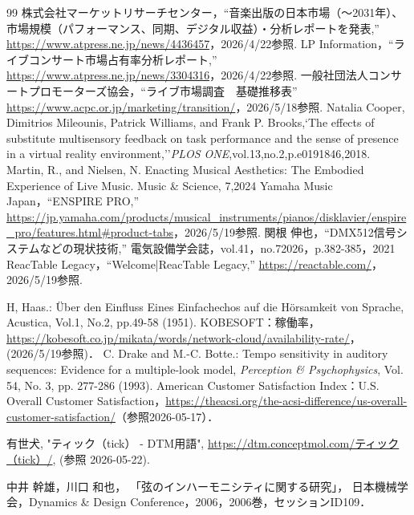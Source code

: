 \documentclass[lualatex,book,paper=a4paper,jafontsize=11.5pt,jafontscale=1.05]{jlreq}
\begin{document}
\clearpage
\begin{thebibliography}{99}
     株式会社マーケットリサーチセンター，``音楽出版の日本市場（～2031年）、市場規模（パフォーマンス、同期、デジタル収益）・分析レポートを発表,'' \url{https://www.atpress.ne.jp/news/4436457}，2026/4/22参照.
     LP Information，``ライブコンサート市場占有率分析レポート,'' \url{https://www.atpress.ne.jp/news/3304316}，2026/4/22参照.
     一般社団法人コンサートプロモーターズ協会，``ライブ市場調査　基礎推移表'' \url{https://www.acpc.or.jp/marketing/transition/}，2026/5/18参照.
     Natalia Cooper, Dimitrios Mileounis, Patrick Williams, and Frank P. Brooks,`The effects of substitute multisensory feedback on task performance and the sense of presence in a virtual reality environment,''\textit{PLOS ONE},vol.13,no.2,p.e0191846,2018.
      Martin, R., and Nielsen, N. Enacting Musical Aesthetics: The Embodied Experience of Live Music. Music \& Science, 7,2024
     Yamaha Music Japan，``ENSPIRE PRO,'' \url{https://jp.yamaha.com/products/musical_instruments/pianos/disklavier/enspire_pro/features.html#product-tabs}，2026/5/19参照.
     関根 伸也，``DMX512信号システムなどの現状技術,'' 電気設備学会誌，vol.41，no.72026，p.382-385，2021
     ReacTable Legacy，``Welcome|ReacTable Legacy,'' \url{https://reactable.com/}，2026/5/19参照.


     H, Haas.: Über den Einfluss Eines Einfachechos auf die Hörsamkeit von Sprache, Acustica, Vol.1, No.2, pp.49-58 (1951). 
    KOBESOFT：稼働率，
        \url{https://kobesoft.co.jp/mikata/words/network-cloud/availability-rate/}，
            (2026/5/19参照)．
    C. Drake and M.-C. Botte.:
    Tempo sensitivity in auditory sequences: Evidence for a multiple-look model,
    \textit{Perception \& Psychophysics},
            Vol. 54, No. 3, pp. 277-286 (1993).
         American Customer Satisfaction Index：U.S. Overall Customer Satisfaction，\url{https://theacsi.org/the-acsi-difference/us-overall-customer-satisfaction/}（参照2026-05-17）．

     有世犬, "ティック（tick） - DTM用語", \url{https://dtm.conceptmol.com/ティック（tick）/}, (参照 2026-05-22).

    中井 幹雄，川口 和也，
    「弦のインハーモニシティに関する研究」，
    日本機械学会，Dynamics \& Design Conference，2006，2006巻，セッションID109．


\end{thebibliography}
\end{document}
